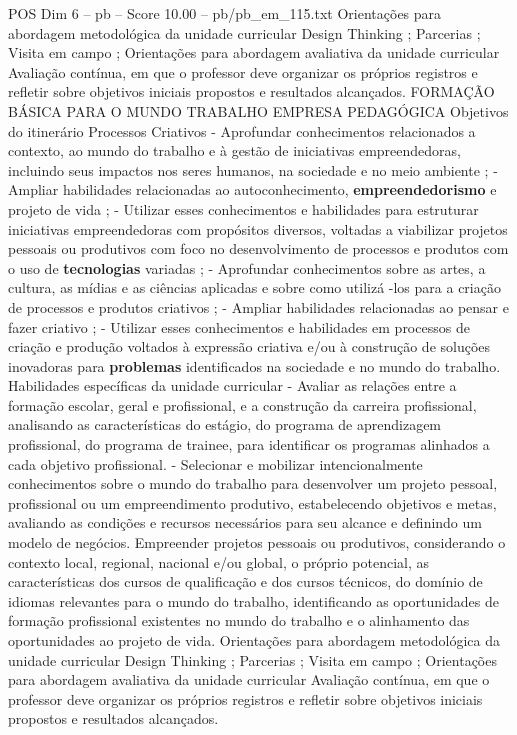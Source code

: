 \begin{textsample}{POS Dim 6 – pb – Score 10.00 – pb/pb\_em\_115.txt}
Orientações para abordagem metodológica da unidade curricular Design Thinking ; Parcerias ; Visita em campo ; Orientações para abordagem avaliativa da unidade curricular Avaliação contínua, em que o professor deve organizar os próprios registros e refletir sobre objetivos iniciais propostos e resultados alcançados.
FORMAÇÃO BÁSICA PARA O MUNDO TRABALHO EMPRESA PEDAGÓGICA Objetivos do itinerário Processos Criativos - Aprofundar conhecimentos relacionados a contexto, ao mundo do trabalho e à gestão de iniciativas empreendedoras, incluindo seus impactos nos seres humanos, na sociedade e no meio ambiente ; - Ampliar habilidades relacionadas ao autoconhecimento, \textbf{empreendedorismo} e projeto de vida ; - Utilizar esses conhecimentos e habilidades para estruturar iniciativas empreendedoras com propósitos diversos, voltadas a viabilizar projetos pessoais ou produtivos com foco no desenvolvimento de processos e produtos com o uso de \textbf{tecnologias} variadas ; - Aprofundar conhecimentos sobre as artes, a cultura, as mídias e as ciências aplicadas e sobre como utilizá -los para a criação de processos e produtos criativos ; - Ampliar habilidades relacionadas ao pensar e fazer criativo ; - Utilizar esses conhecimentos e habilidades em processos de criação e produção voltados à expressão criativa e/ou à construção de soluções inovadoras para \textbf{problemas} identificados na sociedade e no mundo do trabalho.
Habilidades específicas da unidade curricular - Avaliar as relações entre a formação escolar, geral e profissional, e a construção da carreira profissional, analisando as características do estágio, do programa de aprendizagem profissional, do programa de trainee, para identificar os programas alinhados a cada objetivo profissional. - Selecionar e mobilizar intencionalmente conhecimentos sobre o mundo do trabalho para desenvolver um projeto pessoal, profissional ou um empreendimento produtivo, estabelecendo objetivos e metas, avaliando as condições e recursos necessários para seu alcance e definindo um modelo de negócios.
Empreender projetos pessoais ou produtivos, considerando o contexto local, regional, nacional e/ou global, o próprio potencial, as características dos cursos de qualificação e dos cursos técnicos, do domínio de idiomas relevantes para o mundo do trabalho, identificando as oportunidades de formação profissional existentes no mundo do trabalho e o alinhamento das oportunidades ao projeto de vida.
Orientações para abordagem metodológica da unidade curricular Design Thinking ; Parcerias ; Visita em campo ; Orientações para abordagem avaliativa da unidade curricular Avaliação contínua, em que o professor deve organizar os próprios registros e refletir sobre objetivos iniciais propostos e resultados alcançados.

\end{textsample}
